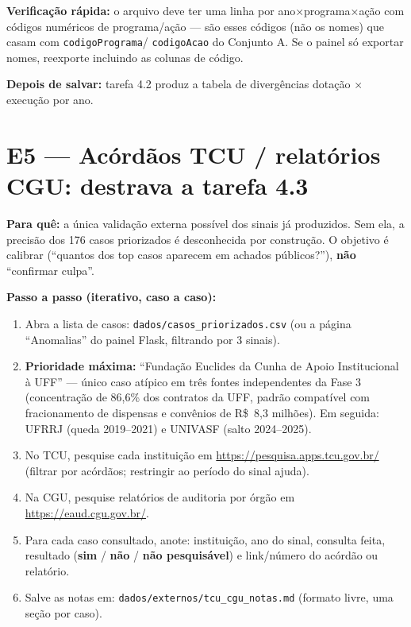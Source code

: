 \documentclass[11pt,a4paper]{article}
\begin{document}
\textbf{Verificação rápida:} o arquivo deve ter uma linha por
ano×programa×ação com códigos numéricos de programa/ação --- são esses
códigos (não os nomes) que casam com \texttt{codigoPrograma}/
\texttt{codigoAcao} do Conjunto A. Se o painel só exportar nomes,
reexporte incluindo as colunas de código.

\textbf{Depois de salvar:} tarefa 4.2 produz a tabela de divergências
dotação × execução por ano.

\section{E5 --- Acórdãos TCU / relatórios CGU: destrava a tarefa 4.3}

\textbf{Para quê:} a única validação externa possível dos sinais já
produzidos. Sem ela, a precisão dos 176 casos priorizados é desconhecida
por construção. O objetivo é calibrar (``quantos dos top casos aparecem em
achados públicos?''), \textbf{não} ``confirmar culpa''.

\textbf{Passo a passo (iterativo, caso a caso):}
\begin{enumerate}
    \item Abra a lista de casos: \texttt{dados/casos\_priorizados.csv}
    (ou a página ``Anomalias'' do painel Flask, filtrando por 3 sinais).
    \item \textbf{Prioridade máxima:} ``Fundação Euclides da Cunha de
    Apoio Institucional à UFF'' --- único caso atípico em três fontes
    independentes da Fase 3 (concentração de 86,6\% dos contratos da UFF,
    padrão compatível com fracionamento de dispensas e convênios de
    R\$~8,3 milhões). Em seguida: UFRRJ (queda 2019--2021) e UNIVASF
    (salto 2024--2025).
    \item No TCU, pesquise cada instituição em
    \url{https://pesquisa.apps.tcu.gov.br/} (filtrar por acórdãos;
    restringir ao período do sinal ajuda).
    \item Na CGU, pesquise relatórios de auditoria por órgão em
    \url{https://eaud.cgu.gov.br/}.
    \item Para cada caso consultado, anote: instituição, ano do sinal,
    consulta feita, resultado (\textbf{sim} / \textbf{não} /
    \textbf{não pesquisável}) e link/número do acórdão ou relatório.
    \item Salve as notas em:
    \texttt{dados/externos/tcu\_cgu\_notas.md} (formato livre, uma seção
    por caso).
\end{enumerate}
\end{document}
